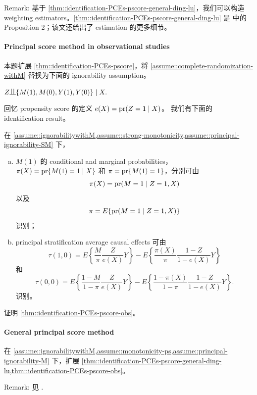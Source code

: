 Remark:
基于 \cref{thm::identification-PCEs-pscore-general-ding-lu}，我们可以构造 weighting estimators。\cref{thm::identification-PCEs-pscore-general-ding-lu} 是 \citet{ding2017principal} 中的 Proposition 2；该文还给出了 estimation 的更多细节。



\paragraph{Principal score method in observational studies}
\label{hw::principalscore-observational}

本题扩展 \cref{thm::identification-PCEs-pscore}，将 \cref{assume::complete-randomization-withM} 替换为下面的 ignorability assumption。


\begin{assumption}
\label{assume::ignorabilitywithM}
$
Z\ind \{ M(1), M(0), Y(1) , Y(0) \} \mid X.
$
\end{assumption}

回忆 propensity score 的定义 $e(X)=\textup{pr}(Z=1\mid X)$。
我们有下面的 identification result。


\begin{theorem}
\label{thm::identification-PCEs-pscore-obs}
在 \cref{assume::ignorabilitywithM,assume::strong-monotonicity,assume::principal-ignorability-SM} 下，
\begin{enumerate}
[(a)]
\item 
$M(1)$ 的 conditional and marginal probabilities，
$\pi(X) =  \textup{pr}\{ M(1)=1\mid X \}  $ 和 $\pi =  \textup{pr}\{ M(1)=1\} $，分别可由
$$
\pi(X)   =  \textup{pr}(M=1\mid Z=1, X ) 
$$ 
以及
$$
\pi  =  E\{\textup{pr}(M=1\mid Z=1, X ) \}
$$ 
识别；
\item
principal stratification average causal effects 可由
$$
\tau(1,0) = E\left\{   \frac{M}{\pi}   \frac{Z}{e(X)} Y \right\}
- E\left\{   \frac{ \pi(X)  }{\pi}   \frac{1-Z}{1-e(X)} Y    \right\} 
$$
和
$$
\tau(0,0) = E\left\{   \frac{1-M}{1-\pi}   \frac{Z}{e(X)} Y \right\}
- E\left\{   \frac{ 1- \pi(X)  }{1 - \pi}   \frac{1-Z}{1-e(X)} Y    \right\} .
$$
识别。
\end{enumerate}
\end{theorem}


证明 \cref{thm::identification-PCEs-pscore-obs}。


 


\paragraph{General principal score method}
\label{hw::general-principal-score-jiangetal}

在 \cref{assume::ignorabilitywithM,assume::monotonicity-ps,assume::principal-ignorability-M} 下，扩展 \cref{thm::identification-PCEs-pscore-general-ding-lu,thm::identification-PCEs-pscore-obs}。


Remark: 见 \citet{jiang2020multiply}.


  
 
